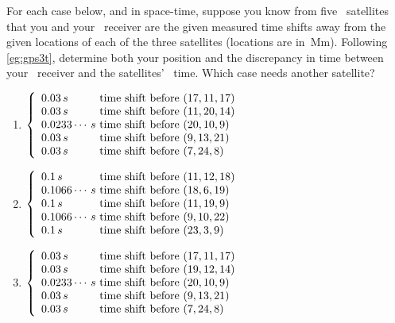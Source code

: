 \begin{comment}
Possibly polynomial\slash multivariate curve fitting (exact)  \larsvii{p.25--8} as example of data mining, and scientific and engineering inference? e.g.~discovering `index' combinations.
Applications involving homogeneous systems, such as balance chemical reactions, leave for the next section.
Nakos~\S1.4 has lots of good ideas (including derivation of cosine rule for triangles).
\end{comment}





\begin{exercise} \label{ex:gps3t} 
For each case below, and in space-time, suppose you know from five \gps\ satellites that you and your \gps\ receiver are the given measured time shifts away from the given locations of each of the three satellites (locations are in~Mm).  
Following \cref{eg:gps3t}, determine both your position and the discrepancy in time between your \gps\ receiver and the satellites' \gps\ time.  
Which case needs another satellite?
\begin{enumerate}
\item  
\(\left\{\begin{array}{l@{\text{ time shift before }}l}
0.03\,s&(17,11,17)\\
0.03\,s&(11,20,14)\\
0.0233\cdots\,s&(20,10,9)\\
0.03\,s&(9,13,21)\\
0.03\,s&(7,24,8)
\end{array}\right.\)

\item 
\(\left\{\begin{array}{l@{\text{ time shift before }}l}
0.1\,s&(11,12,18)\\
0.1066\cdots\,s&(18,6,19)\\
0.1\,s&(11,19,9)\\
0.1066\cdots\,s&(9,10,22)\\
0.1\,s&(23,3,9)
\end{array}\right.\)

\item 
\(\left\{\begin{array}{l@{\text{ time shift before }}l}
0.03\,s&(17,11,17)\\
0.03\,s&(19,12,14)\\
0.0233\cdots\,s&(20,10,9)\\
0.03\,s&(9,13,21)\\
0.03\,s&(7,24,8)
\end{array}\right.\)

\end{enumerate}
\end{exercise}




